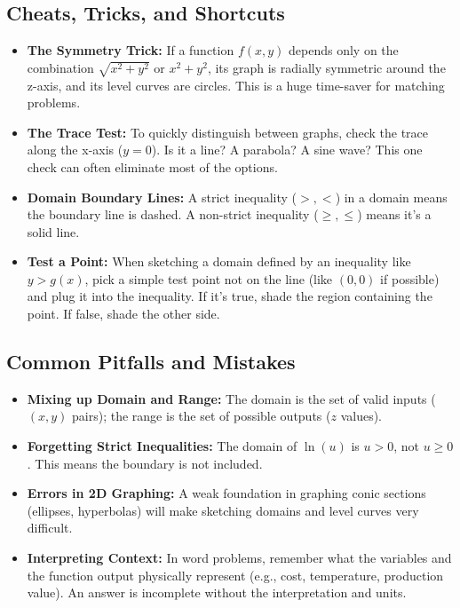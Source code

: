 \documentclass{article}
\begin{document}
\subsection{Cheats, Tricks, and Shortcuts}
\begin{itemize}
    \item \textbf{The Symmetry Trick:} If a function $f(x, y)$ depends only on the combination $\sqrt{x^2+y^2}$ or $x^2+y^2$, its graph is radially symmetric around the z-axis, and its level curves are circles. This is a huge time-saver for matching problems.
    \item \textbf{The Trace Test:} To quickly distinguish between graphs, check the trace along the x-axis ($y=0$). Is it a line? A parabola? A sine wave? This one check can often eliminate most of the options.
    \item \textbf{Domain Boundary Lines:} A strict inequality ($>, <$) in a domain means the boundary line is dashed. A non-strict inequality ($\ge, \le$) means it's a solid line.
    \item \textbf{Test a Point:} When sketching a domain defined by an inequality like $y > g(x)$, pick a simple test point not on the line (like $(0,0)$ if possible) and plug it into the inequality. If it's true, shade the region containing the point. If false, shade the other side.
\end{itemize}

\subsection{Common Pitfalls and Mistakes}
\begin{itemize}
    \item \textbf{Mixing up Domain and Range:} The domain is the set of valid inputs ($(x,y)$ pairs); the range is the set of possible outputs ($z$ values).
    \item \textbf{Forgetting Strict Inequalities:} The domain of $\ln(u)$ is $u > 0$, not $u \ge 0$. This means the boundary is not included.
    \item \textbf{Errors in 2D Graphing:} A weak foundation in graphing conic sections (ellipses, hyperbolas) will make sketching domains and level curves very difficult.
    \item \textbf{Interpreting Context:} In word problems, remember what the variables and the function output physically represent (e.g., cost, temperature, production value). An answer is incomplete without the interpretation and units.
\end{itemize}
\end{document}
